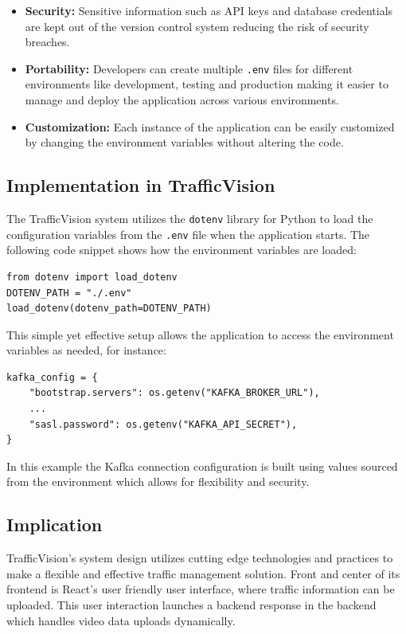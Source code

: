 \begin{itemize}
    \item \textbf{Security:} Sensitive information such as API keys and database credentials are kept out of the version control system reducing the risk of security breaches.
    \item \textbf{Portability:} Developers can create multiple \texttt{.env} files for different environments like development, testing and production making it easier to manage and deploy the application across various environments.
    \item \textbf{Customization:} Each instance of the application can be easily customized by changing the environment variables without altering the code.
\end{itemize}

\subsection{Implementation in TrafficVision}

The TrafficVision system utilizes the \texttt{dotenv} library for Python to load the configuration variables from the \texttt{.env} file when the application starts. The following code snippet shows how the environment variables are loaded:

\begin{verbatim}
from dotenv import load_dotenv
DOTENV_PATH = "./.env"
load_dotenv(dotenv_path=DOTENV_PATH)
\end{verbatim}

This simple yet effective setup allows the application to access the environment variables as needed, for instance:

\begin{verbatim}
kafka_config = {
    "bootstrap.servers": os.getenv("KAFKA_BROKER_URL"),
    ...
    "sasl.password": os.getenv("KAFKA_API_SECRET"),
}
\end{verbatim}

In this example the Kafka connection configuration is built using values sourced from the environment which allows for flexibility and security.

\subsection{Implication}
TrafficVision's system design utilizes cutting edge technologies and practices to make a flexible and effective traffic management solution. Front and center of its frontend is React's user friendly user interface, where traffic information can be uploaded. This user interaction launches a backend response in the backend which handles video data uploads dynamically.

